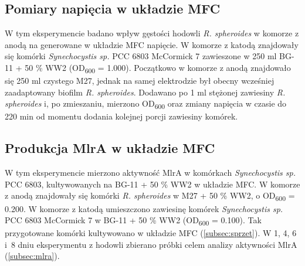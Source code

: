\subsection{Pomiary napięcia w układzie MFC}\label{subsec:volt}
W tym eksperymencie badano wpływ gęstości hodowli
\textit{R. spheroides} w komorze z anodą na generowane
w układzie MFC napięcie.
W komorze z katodą znajdowały się komórki
\textit{Synechocystis sp.} PCC 6803 McCormick 7
zawieszone w 250 ml BG-11 + 50 \% WW2
(OD\textsubscript{600} = 1.000).
Początkowo w komorze z anodą znajdowało się 250 ml
czystego M27, jednak na samej elektrodzie był
obecny wcześniej zaadaptowany biofilm \textit{R. spheroides}.
Dodawano po 1 ml stężonej zawiesiny \textit{R. spheroides}
i, po zmieszaniu, mierzono OD\textsubscript{600} oraz
zmiany napięcia w czasie do 220 min od momentu dodania
kolejnej porcji zawiesiny komórek.

\subsection{Produkcja MlrA w układzie MFC}\label{subsec:mfc}
W tym eksperymencie mierzono aktywność MlrA
w komórkach \textit{Synechocystis sp.} PCC 6803,
kultywowanych na BG-11 + 50 \% WW2 w układzie MFC\@.
W komorze z anodą znajdowały się komórki
\textit{R. spheroides} w M27 + 50 \% WW2,
o OD\textsubscript{600} = 0.200.
W komorze z katodą umieszczono zawiesinę komórek
\textit{Synechocystis sp.} PCC 6803 McCormick 7
w BG-11 + 50 \% WW2 (OD\textsubscript{600} = 0.100).
Tak przygotowane komórki kultywowano w układzie MFC (\ref{subsec:sprzet}).
W 1, 4, 6 i~8 dniu eksperymentu z hodowli zbierano próbki
celem analizy aktywności MlrA (\ref{subsec:mlra}).